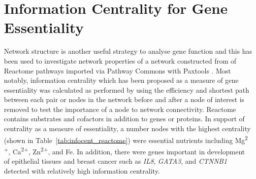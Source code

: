 \FloatBarrier

\chapter{Information Centrality for Gene Essentiality}
\label{appendix:infocent_essential}

\FloatBarrier


Network structure is another useful strategy to analyse gene function and this has been used to investigate network properties of a network constructed from of Reactome pathways imported via Pathway Commons with Paxtools \citep{PathwayCommons, paxtools}. Most notably, information centrality which has been proposed as a measure of gene essentiality was calculated as performed by \citet{Kranthi2013} using the efficiency and shortest path between each pair or nodes in the network before and after a node of interest is removed to test the importance of a node to network connectivity. Reactome contains substrates and cofactors in addition to genes or proteins. In support of centrality as a measure of essentiality, a number nodes with the highest centrality (shown in Table~\ref{tab:infocent_reactome}) were essential nutrients including Mg\textsuperscript{2$+$}, Ca\textsuperscript{2$+$}, Zn\textsuperscript{2$+$},  and Fe. In addition, there were genes important in development of epithelial tissues and breast cancer such as \textit{IL8}, \textit{GATA3}, and \textit{CTNNB1} detected with relatively high information centrality. 

